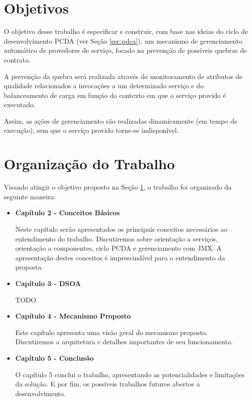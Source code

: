 \section{Objetivos}
\label{sec:obj}

O objetivo desse trabalho é especificar e construir, com base nas ideias do ciclo de desenvolvimento PCDA (ver Seção \ref{sec:pdca}), um mecanismo de gerenciamento automático de provedores de serviço, focado na prevenção de possíveis quebras de contrato.

A prevenção da quebra será realizada através do monitoramento de atributos de qualidade relacionados a invocações a um determinado serviço e do balanceamento de carga em função do contexto em que o serviço provido é executado. 

Assim, as ações de gerenciamento são realizadas dinamicamente (em tempo de execução), sem que o serviço provido torne-se indisponível.



\section{Organização do Trabalho}
Visando atingir o objetivo proposto na Seção \ref{sec:obj}, o trabalho foi organizado da seguinte maneira:
\begin{itemize}

\item \textbf{Capítulo 2 - Conceitos Básicos}

Neste capítulo serão apresentados os principais conceitos necessários ao entendimento do trabalho. Discutiremos sobre orientação a serviços, orientação a componentes, ciclo PCDA e gerenciamento com JMX. A apresentação destes conceitos é imprescindível para o entendimento da proposta.

\item \textbf{Capítulo 3 - DSOA}

TODO

\item \textbf{Capítulo 4 - Mecanismo Proposto}

Este capítulo apresenta uma visão geral do mecanismo proposto. Discutiremos a arquitetura e detalhes importantes de seu funcionamento.

\item \textbf{Capítulo 5 - Conclusão}

O capítulo 5 conclui o trabalho, apresentando as potencialidades e limitações da solução. E por fim, os possíveis trabalhos futuros abertos a desenvolvimento.

\end{itemize}


